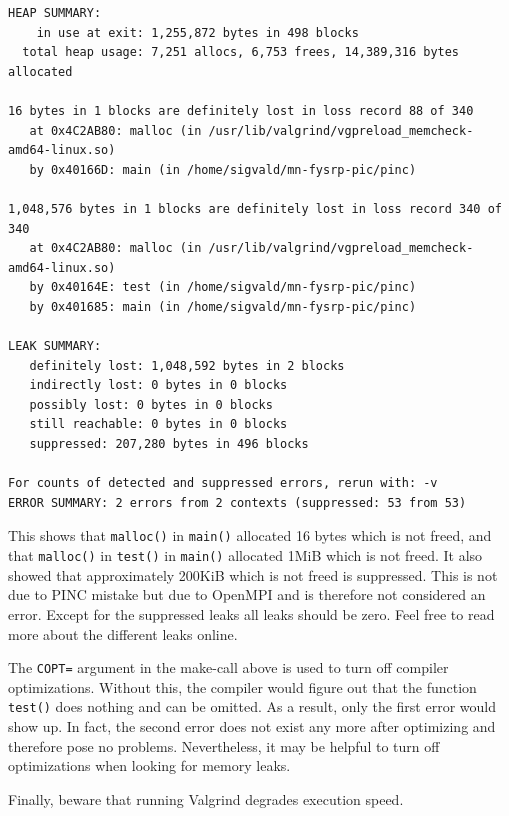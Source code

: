 \documentclass[10pt,a4paper]{article}
\begin{document}
\begin{verbatim}
HEAP SUMMARY:
    in use at exit: 1,255,872 bytes in 498 blocks
  total heap usage: 7,251 allocs, 6,753 frees, 14,389,316 bytes allocated

16 bytes in 1 blocks are definitely lost in loss record 88 of 340
   at 0x4C2AB80: malloc (in /usr/lib/valgrind/vgpreload_memcheck-amd64-linux.so)
   by 0x40166D: main (in /home/sigvald/mn-fysrp-pic/pinc)

1,048,576 bytes in 1 blocks are definitely lost in loss record 340 of 340
   at 0x4C2AB80: malloc (in /usr/lib/valgrind/vgpreload_memcheck-amd64-linux.so)
   by 0x40164E: test (in /home/sigvald/mn-fysrp-pic/pinc)
   by 0x401685: main (in /home/sigvald/mn-fysrp-pic/pinc)

LEAK SUMMARY:
   definitely lost: 1,048,592 bytes in 2 blocks
   indirectly lost: 0 bytes in 0 blocks
   possibly lost: 0 bytes in 0 blocks
   still reachable: 0 bytes in 0 blocks
   suppressed: 207,280 bytes in 496 blocks

For counts of detected and suppressed errors, rerun with: -v
ERROR SUMMARY: 2 errors from 2 contexts (suppressed: 53 from 53)
\end{verbatim}

This shows that \lstinline$malloc()$ in \lstinline$main()$ allocated 16 bytes which is not freed, and that \lstinline$malloc()$ in \lstinline$test()$ in \lstinline$main()$ allocated 1MiB which is not freed. It also showed that approximately 200KiB which is not freed is suppressed. This is not due to PINC mistake but due to OpenMPI and is therefore not considered an error. Except for the suppressed leaks all leaks should be zero. Feel free to read more about the different leaks online.

The \verb$COPT=$ argument in the make-call above is used to turn off compiler optimizations. Without this, the compiler would figure out that the function \lstinline$test()$ does nothing and can be omitted. As a result, only the first error would show up. In fact, the second error does not exist any more after optimizing and therefore pose no problems. Nevertheless, it may be helpful to turn off optimizations when looking for memory leaks.

Finally, beware that running Valgrind degrades execution speed.
\end{document}
